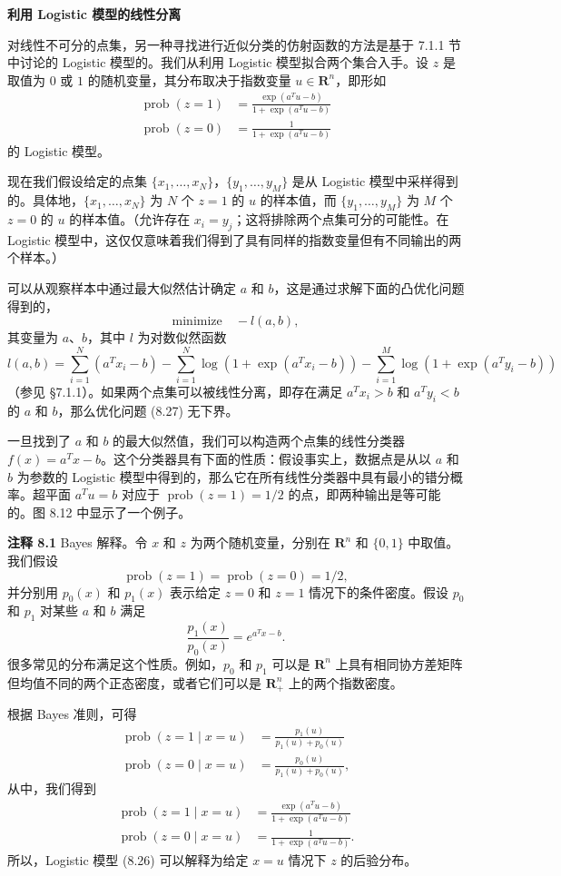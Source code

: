\documentclass[UTF8,12pt,a4paper,fontset=fandol]{ctexart}
\begin{document}
\noindent\textbf{利用 Logistic 模型的线性分离}

对线性不可分的点集，另一种寻找进行近似分类的仿射函数的方法是基于 7.1.1 节中讨论的 Logistic 模型的。我们从利用 Logistic 模型拟合两个集合入手。设 $z$ 是取值为 $0$ 或 $1$ 的随机变量，其分布取决于指数变量 $u\in\mathbf{R}^n$，即形如
\[
\begin{split}
\operatorname{prob}(z=1)&=\frac{\exp(a^Tu-b)}{1+\exp(a^Tu-b)}\\
\operatorname{prob}(z=0)&=\frac{1}{1+\exp(a^Tu-b)}
\end{split}
\tag{8.26}
\]
的 Logistic 模型。

现在我们假设给定的点集 $\{x_1,\ldots,x_N\}$，$\{y_1,\ldots,y_M\}$ 是从 Logistic 模型中采样得到的。具体地，$\{x_1,\ldots,x_N\}$ 为 $N$ 个 $z=1$ 的 $u$ 的样本值，而 $\{y_1,\ldots,y_M\}$ 为 $M$ 个 $z=0$ 的 $u$ 的样本值。（允许存在 $x_i=y_j$；这将排除两个点集可分的可能性。在 Logistic 模型中，这仅仅意味着我们得到了具有同样的指数变量但有不同输出的两个样本。）

可以从观察样本中通过最大似然估计确定 $a$ 和 $b$，这是通过求解下面的凸优化问题得到的，
\[
\mbox{minimize}\quad -l(a,b),
\tag{8.27}
\]
其变量为 $a$、$b$，其中 $l$ 为对数似然函数
\[
l(a,b)=\sum_{i=1}^N(a^Tx_i-b)
-\sum_{i=1}^N\log(1+\exp(a^Tx_i-b))
-\sum_{i=1}^M\log(1+\exp(a^Ty_i-b))
\]
（参见 \S 7.1.1）。如果两个点集可以被线性分离，即存在满足 $a^Tx_i>b$ 和 $a^Ty_i<b$ 的 $a$ 和 $b$，那么优化问题 (8.27) 无下界。

一旦找到了 $a$ 和 $b$ 的最大似然值，我们可以构造两个点集的线性分类器 $f(x)=a^Tx-b$。这个分类器具有下面的性质：假设事实上，数据点是从以 $a$ 和 $b$ 为参数的 Logistic 模型中得到的，那么它在所有线性分类器中具有最小的错分概率。超平面 $a^Tu=b$ 对应于 $\operatorname{prob}(z=1)=1/2$ 的点，即两种输出是等可能的。图 8.12 中显示了一个例子。

\noindent\textbf{注释 8.1}\quad
Bayes 解释。令 $x$ 和 $z$ 为两个随机变量，分别在 $\mathbf{R}^n$ 和 $\{0,1\}$ 中取值。我们假设
\[
\operatorname{prob}(z=1)=\operatorname{prob}(z=0)=1/2,
\]
并分别用 $p_0(x)$ 和 $p_1(x)$ 表示给定 $z=0$ 和 $z=1$ 情况下的条件密度。假设 $p_0$ 和 $p_1$ 对某些 $a$ 和 $b$ 满足
\[
\frac{p_1(x)}{p_0(x)}=e^{a^Tx-b}.
\]
很多常见的分布满足这个性质。例如，$p_0$ 和 $p_1$ 可以是 $\mathbf{R}^n$ 上具有相同协方差矩阵但均值不同的两个正态密度，或者它们可以是 $\mathbf{R}_+^n$ 上的两个指数密度。

根据 Bayes 准则，可得
\[
\begin{split}
\operatorname{prob}(z=1\mid x=u)&=\frac{p_1(u)}{p_1(u)+p_0(u)}\\
\operatorname{prob}(z=0\mid x=u)&=\frac{p_0(u)}{p_1(u)+p_0(u)},
\end{split}
\]
从中，我们得到
\[
\begin{split}
\operatorname{prob}(z=1\mid x=u)&=\frac{\exp(a^Tu-b)}{1+\exp(a^Tu-b)}\\
\operatorname{prob}(z=0\mid x=u)&=\frac{1}{1+\exp(a^Tu-b)}.
\end{split}
\]
所以，Logistic 模型 (8.26) 可以解释为给定 $x=u$ 情况下 $z$ 的后验分布。
\end{document}
